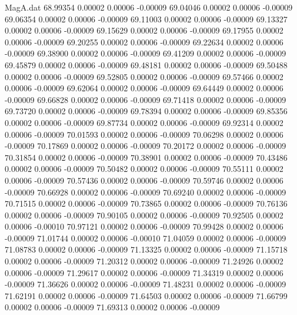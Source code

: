 \begin{filecontents}{MagA.dat}
  68.99354    0.00002    0.00006   -0.00009
  69.04046    0.00002    0.00006   -0.00009
  69.06354    0.00002    0.00006   -0.00009
  69.11003    0.00002    0.00006   -0.00009
  69.13327    0.00002    0.00006   -0.00009
  69.15629    0.00002    0.00006   -0.00009
  69.17955    0.00002    0.00006   -0.00009
  69.20255    0.00002    0.00006   -0.00009
  69.22634    0.00002    0.00006   -0.00009
  69.38900    0.00002    0.00006   -0.00009
  69.41209    0.00002    0.00006   -0.00009
  69.45879    0.00002    0.00006   -0.00009
  69.48181    0.00002    0.00006   -0.00009
  69.50488    0.00002    0.00006   -0.00009
  69.52805    0.00002    0.00006   -0.00009
  69.57466    0.00002    0.00006   -0.00009
  69.62064    0.00002    0.00006   -0.00009
  69.64449    0.00002    0.00006   -0.00009
  69.66828    0.00002    0.00006   -0.00009
  69.71418    0.00002    0.00006   -0.00009
  69.73720    0.00002    0.00006   -0.00009
  69.78394    0.00002    0.00006   -0.00009
  69.85356    0.00002    0.00006   -0.00009
  69.87734    0.00002    0.00006   -0.00009
  69.92314    0.00002    0.00006   -0.00009
  70.01593    0.00002    0.00006   -0.00009
  70.06298    0.00002    0.00006   -0.00009
  70.17869    0.00002    0.00006   -0.00009
  70.20172    0.00002    0.00006   -0.00009
  70.31854    0.00002    0.00006   -0.00009
  70.38901    0.00002    0.00006   -0.00009
  70.43486    0.00002    0.00006   -0.00009
  70.50482    0.00002    0.00006   -0.00009
  70.55111    0.00002    0.00006   -0.00009
  70.57436    0.00002    0.00006   -0.00009
  70.59746    0.00002    0.00006   -0.00009
  70.66928    0.00002    0.00006   -0.00009
  70.69240    0.00002    0.00006   -0.00009
  70.71515    0.00002    0.00006   -0.00009
  70.73865    0.00002    0.00006   -0.00009
  70.76136    0.00002    0.00006   -0.00009
  70.90105    0.00002    0.00006   -0.00009
  70.92505    0.00002    0.00006   -0.00010
  70.97121    0.00002    0.00006   -0.00009
  70.99428    0.00002    0.00006   -0.00009
  71.01744    0.00002    0.00006   -0.00010
  71.04059    0.00002    0.00006   -0.00009
  71.08783    0.00002    0.00006   -0.00009
  71.13325    0.00002    0.00006   -0.00009
  71.15718    0.00002    0.00006   -0.00009
  71.20312    0.00002    0.00006   -0.00009
  71.24926    0.00002    0.00006   -0.00009
  71.29617    0.00002    0.00006   -0.00009
  71.34319    0.00002    0.00006   -0.00009
  71.36626    0.00002    0.00006   -0.00009
  71.48231    0.00002    0.00006   -0.00009
  71.62191    0.00002    0.00006   -0.00009
  71.64503    0.00002    0.00006   -0.00009
  71.66799    0.00002    0.00006   -0.00009
  71.69313    0.00002    0.00006   -0.00009

\end{filecontents}
